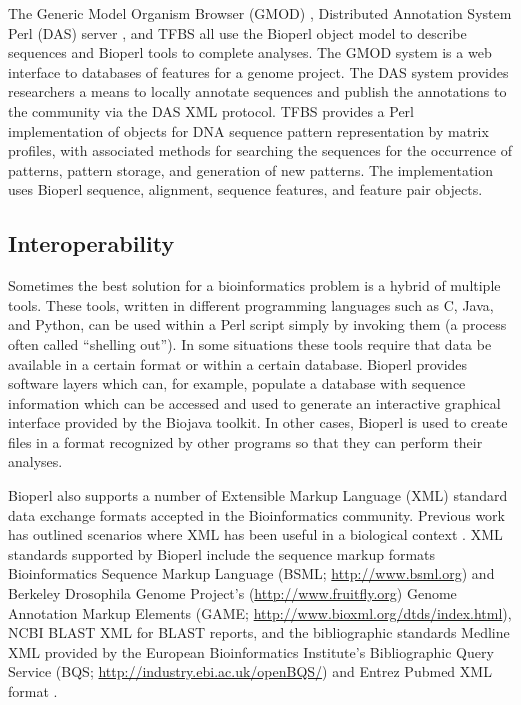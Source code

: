 \documentclass[12pt]{article}
\begin{document}
The Generic Model Organism Browser (GMOD) \cite{gmod}, Distributed
Annotation System Perl (DAS) server \cite{das}, and TFBS
\cite{tfbs} all use the Bioperl object model to describe sequences and
Bioperl tools to complete analyses.  The GMOD system is a web
interface to databases of features for a genome project.  The DAS
system provides researchers a means to locally annotate sequences and
publish the annotations to the community via the DAS XML protocol.
TFBS provides a Perl implementation of objects for DNA sequence pattern
representation by matrix profiles, with associated methods for searching
the sequences for the occurrence of patterns, pattern storage, and
generation of new patterns. The implementation uses Bioperl sequence,
alignment, sequence features, and feature pair objects.

\subsection{Interoperability}

Sometimes the best solution for a bioinformatics problem is a hybrid
of multiple tools.  These tools, written in different programming
languages such as C, Java, and Python, can be used within a Perl
script simply by invoking them (a process often called ``shelling
out'').  In some situations these tools require that data be available
in a certain format or within a certain database.  Bioperl provides
software layers which can, for example, populate a database with
sequence information which can be accessed and used to generate an
interactive graphical interface provided by the Biojava toolkit.
In other cases, Bioperl is used to create files in a format recognized
by other programs so that they can perform their analyses. 

Bioperl also supports a number of Extensible Markup Language (XML)
standard data exchange formats accepted in the Bioinformatics
community.  Previous work has outlined scenarios where XML has been
useful in a biological context \cite{xmlbioinformatics}.  XML
standards supported by Bioperl include the sequence markup formats
Bioinformatics Sequence Markup Language (BSML;
\url{http://www.bsml.org}) and Berkeley Drosophila Genome Project's
(\url{http://www.fruitfly.org}) Genome Annotation Markup Elements
(GAME; \url{http://www.bioxml.org/dtds/index.html}), NCBI BLAST XML
for BLAST reports, and the bibliographic standards Medline XML
provided by the European Bioinformatics Institute's Bibliographic
Query Service (BQS; \url{http://industry.ebi.ac.uk/openBQS/}) and
Entrez Pubmed XML format \cite{entrez}.
\end{document}
